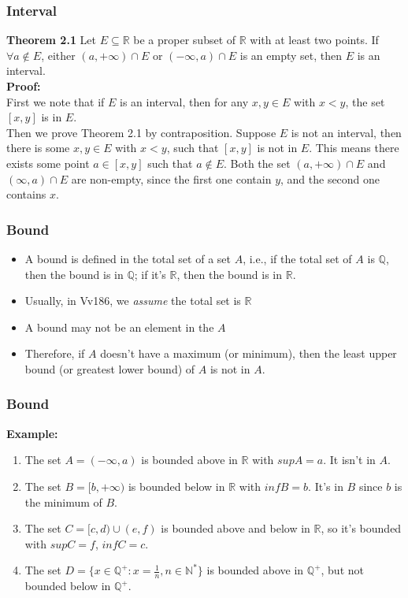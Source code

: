 \documentclass[12pt, t]{beamer}
\renewcommand{\emph}[1]{{\color{Turquoise3}\textsl{#1}}}
\begin{document}
\begin{frame}
    \frametitle{Interval}
    \textbf{Theorem 2.1} Let $E \subseteq \mathbb{R}$ be a proper subset of $\mathbb{R}$ with at least two
    points. If $\forall a \notin E$, either $(a,+\infty)\cap E$ or $(-\infty, a)\cap E$ is an
    empty set, then $E$ is an interval.\\
    \textbf{Proof:}\\
    \hspace{1em} First we note that if $E$ is an interval, then for any $x,y\in E$ with $x<y$,
    the set $[x,y]$ is in $E$.\\
    \hspace{1em} Then we prove Theorem 2.1 by contraposition. Suppose $E$ is not an interval,
    then there is some $x,y\in E$ with $x<y$, such that $[x,y]$ is not in $E$. This means there
    exists some point $a\in [x,y]$ such that $a\notin E$. Both the set $(a,+\infty)\cap E$ and
    $(\infty,a)\cap E$ are non-empty, since the first one contain $y$, and the second one contains $x$.
\end{frame}

\begin{frame}
    \frametitle{Bound}
    \begin{itemize}
        \item A bound is defined in the total set of a set $A$, i.e., if the total set of $A$
              is $\mathbb{Q}$, then the bound is in $\mathbb{Q}$; if it's $\mathbb{R}$, then the
              bound is in $\mathbb{R}$.
        \item Usually, in Vv186, we \emph{assume} the total set is $\mathbb{R}$
        \item A bound may not be an element in the $A$
        \item Therefore, if $A$ doesn't have a maximum (or minimum), then the least upper bound
              (or greatest lower bound) of $A$ is not in $A$.
    \end{itemize}
\end{frame}

\begin{frame}
    \frametitle{Bound}
    \textbf{Example:}\\
    \begin{enumerate}
        \item The set $A=(-\infty, a)$ is bounded above in $\mathbb{R}$ with $supA=a$. It isn't in $A$.
        \item The set $B=[b,+\infty)$ is bounded below in $\mathbb{R}$ with $infB=b$. It's in $B$ since $b$ is the minimum of $B$.
        \item The set $C=[c,d)\cup(e,f)$ is bounded above and below in $\mathbb{R}$, so it's bounded with $supC=f$, $infC=c$.
        \item The set $D=\{x\in \mathbb{Q}^+: x=\frac{1}{n}, n\in \mathbb{N}^*\}$ is bounded above in $\mathbb{Q}^+$, but not bounded
              below in $\mathbb{Q}^+$.
    \end{enumerate}
\end{frame}
\end{document}
